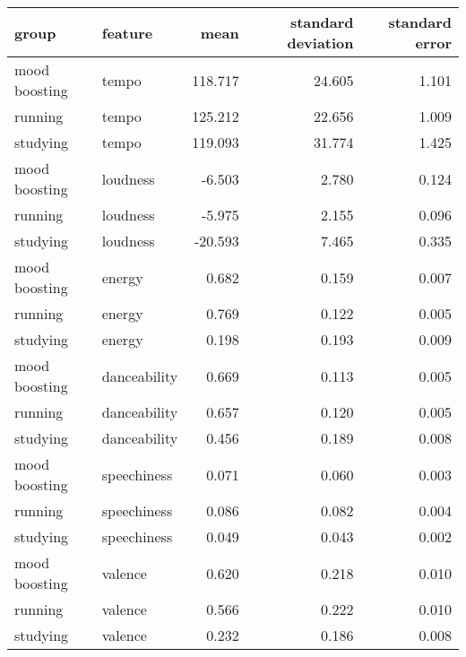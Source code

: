 \begin{tabular}{llrrr}
\toprule
        group &      feature &    mean &  standard deviation &  standard error \\
\midrule
mood boosting &        tempo & 118.717 &              24.605 &           1.101 \\
      running &        tempo & 125.212 &              22.656 &           1.009 \\
     studying &        tempo & 119.093 &              31.774 &           1.425 \\
mood boosting &     loudness &  -6.503 &               2.780 &           0.124 \\
      running &     loudness &  -5.975 &               2.155 &           0.096 \\
     studying &     loudness & -20.593 &               7.465 &           0.335 \\
mood boosting &       energy &   0.682 &               0.159 &           0.007 \\
      running &       energy &   0.769 &               0.122 &           0.005 \\
     studying &       energy &   0.198 &               0.193 &           0.009 \\
mood boosting & danceability &   0.669 &               0.113 &           0.005 \\
      running & danceability &   0.657 &               0.120 &           0.005 \\
     studying & danceability &   0.456 &               0.189 &           0.008 \\
mood boosting &  speechiness &   0.071 &               0.060 &           0.003 \\
      running &  speechiness &   0.086 &               0.082 &           0.004 \\
     studying &  speechiness &   0.049 &               0.043 &           0.002 \\
mood boosting &      valence &   0.620 &               0.218 &           0.010 \\
      running &      valence &   0.566 &               0.222 &           0.010 \\
     studying &      valence &   0.232 &               0.186 &           0.008 \\
\bottomrule
\end{tabular}
